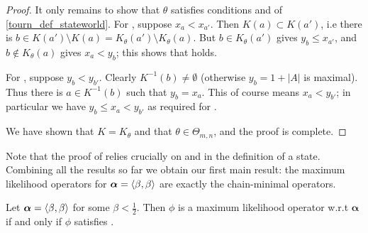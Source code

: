 \begin{proof}
    It only remains to show that $\theta$ satisfies conditions
     and  of
    \cref{tourn_def_stateworld}. For , suppose $x_a
    < x_{a'}$. Then $K(a) \subset K(a')$, i.e there is $b \in K(a') \setminus
    K(a) = K_\theta(a') \setminus K_\theta(a)$. But $b \in K_\theta(a')$ gives
    $y_b \le x_{a'}$, and $b \not\in K_\theta(a)$ gives $x_a < y_b$; this shows
    that  holds.

    For , suppose $y_b < y_{b'}$. Clearly
    $K^{-1}(b) \ne \emptyset$ (otherwise $y_b = 1 + |A|$ is maximal). Thus
    there is $a \in K^{-1}(b)$ such that $y_b = x_a$. This of course means $x_a
    < y_{b'}$; in particular we have $y_b \le x_a < y_{b'}$ as required for
    .

    We have shown that $K = K_\theta$ and that $\theta \in \Theta_{m,n}$, and the
    proof is complete.
\end{proof}

Note that the proof of  relies crucially on
 and
 in the definition of a state. Combining
all the results so far we obtain our first main result: the maximum likelihood
operators for $\bm{\alpha} = \langle {\beta,\beta} \rangle$ are exactly the chain-minimal
operators.

\begin{theorem}
   \label{tourn_result_mle_iff_chainmin_operator}
   Let $\bm{\alpha} = \langle {\beta, \beta} \rangle$ for some $\beta < \frac{1}{2}$.
   Then $\phi$ is a maximum likelihood operator w.r.t $\bm{\alpha}$
    if and only if $\phi$ satisfies \chainmin{}.
\end{theorem}

